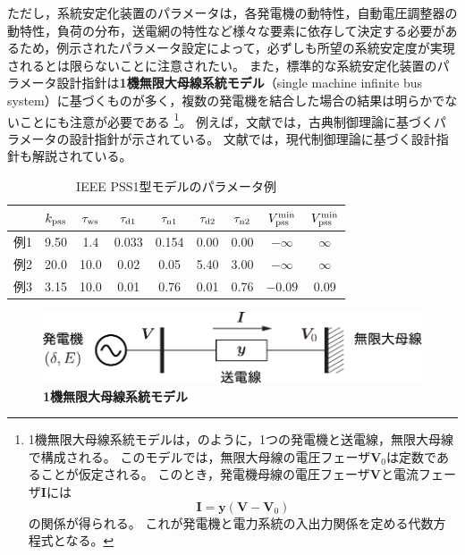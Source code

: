 \documentclass[tombow,dvipdfmx]{corona-a5-1.1}
\begin{document}
ただし，系統安定化装置のパラメータは，各発電機の動特性，自動電圧調整器の動特性，負荷の分布，送電網の特性など様々な要素に依存して決定する必要があるため，例示されたパラメータ設定によって，必ずしも所望の系統安定度が実現されるとは限らないことに注意されたい。
また，標準的な系統安定化装置のパラメータ設計指針は\textbf{1機無限大母線系統モデル}（single machine infinite bus system）に基づくものが多く，複数の発電機を結合した場合の結果は明らかでないことにも注意が必要である
\footnote{
1機無限大母線系統モデルは，のように，1つの発電機と送電線，無限大母線で構成される。
このモデルでは，無限大母線の電圧フェーザ$\bm{V}_0$は定数であることが仮定される。
このとき，発電機母線の電圧フェーザ$\bm{V}$と電流フェーザ$\bm{I}$には
\[
\bm{I}= \bm{y} (\bm{V}-\bm{V}_0)
\]
の関係が得られる。
これが発電機と電力系統の入出力関係を定める代数方程式となる。
}。
例えば，文献\cite[12.5節]{kundur1994power}では，古典制御理論に基づくパラメータの設計指針が示されている。
文献\cite{chow2004power}では，現代制御理論に基づく設計指針も解説されている。


\begin{table}[h]
\medskip
 \caption{IEEE PSS1型モデルのパラメータ例}
 \label{table:psspara}
 \centering
  \begin{tabular}{|c|c|c|c|c|c|c|c|c|}
   \hline
 &  $k_{\rm pss}$ & $\tau_{\rm ws}$ & $\tau_{{\rm d}1}$ & $\tau_{{\rm n}1}$ & $\tau_{{\rm d}2}$ & $\tau_{{\rm n}2}$ & $V_{\rm pss}^{\rm min}$ & $V_{\rm pss}^{\rm min}$ \\
   \hline \hline
   例1 \cite[12.5節]{kundur1994power}& 9.50 & 1.4 & 0.033 & 0.154 & 0.00 & 0.00 & $-\infty$ & $\infty$ \\
   \hline   
   例2 \cite[12.8節]{kundur1994power}& 20.0 & 10.0 & 0.02 & 0.05 & 5.40 & 3.00 & $-\infty$ & $\infty$ \\
   \hline
   例3 \cite[Table H.3]{ieee2016ieee}& 3.15 & 10.0 & 0.01 & 0.76 & 0.01 & 0.76 & $-0.09$ & 0.09\\
   \hline
  \end{tabular}
\end{table}

\begin{figure}[t]
\centering
\includegraphics[width = .70\linewidth]{figs/inf1bus}
\medskip
\caption{\textbf{1機無限大母線系統モデル}}
\label{fig:inf1bus}
\medskip
\end{figure}
\end{document}
